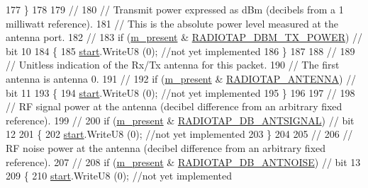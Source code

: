 \begin{DoxyCode}
177     \}
178 
179   \textcolor{comment}{//}
180   \textcolor{comment}{// Transmit power expressed as dBm (decibels from a 1 milliwatt reference).}
181   \textcolor{comment}{// This is the absolute power level measured at the antenna port.}
182   \textcolor{comment}{//}
183   \textcolor{keywordflow}{if} (\hyperlink{classns3_1_1RadiotapHeader_a8b8aca212245ad4ad1aa796d4cc802bb}{m\_present} & \hyperlink{classns3_1_1RadiotapHeader_afd15dfe66387dfbcbf62865d024f58ffa5f2ae8d187d9e12a5f253dddd4426c38}{RADIOTAP\_DBM\_TX\_POWER}) \textcolor{comment}{// bit 10}
184     \{
185       \hyperlink{namespacevisualizer_1_1core_a2a35e5d8a34af358b508dac8635754e0}{start}.WriteU8 (0); \textcolor{comment}{//not yet implemented}
186     \}
187 
188   \textcolor{comment}{//}
189   \textcolor{comment}{// Unitless indication of the Rx/Tx antenna for this packet.}
190   \textcolor{comment}{// The first antenna is antenna 0.}
191   \textcolor{comment}{//}
192   \textcolor{keywordflow}{if} (\hyperlink{classns3_1_1RadiotapHeader_a8b8aca212245ad4ad1aa796d4cc802bb}{m\_present} & \hyperlink{classns3_1_1RadiotapHeader_afd15dfe66387dfbcbf62865d024f58ffaa440618ab1f857767691342a07af46f9}{RADIOTAP\_ANTENNA}) \textcolor{comment}{// bit 11}
193     \{
194       \hyperlink{namespacevisualizer_1_1core_a2a35e5d8a34af358b508dac8635754e0}{start}.WriteU8 (0); \textcolor{comment}{//not yet implemented}
195     \}
196 
197   \textcolor{comment}{//}
198   \textcolor{comment}{// RF signal power at the antenna (decibel difference from an arbitrary fixed reference).}
199   \textcolor{comment}{//}
200   \textcolor{keywordflow}{if} (\hyperlink{classns3_1_1RadiotapHeader_a8b8aca212245ad4ad1aa796d4cc802bb}{m\_present} & \hyperlink{classns3_1_1RadiotapHeader_afd15dfe66387dfbcbf62865d024f58ffa90aae5cb5f719c05f34dfbedaf390828}{RADIOTAP\_DB\_ANTSIGNAL}) \textcolor{comment}{// bit 12}
201     \{
202       \hyperlink{namespacevisualizer_1_1core_a2a35e5d8a34af358b508dac8635754e0}{start}.WriteU8 (0); \textcolor{comment}{//not yet implemented}
203     \}
204 
205   \textcolor{comment}{//}
206   \textcolor{comment}{// RF noise power at the antenna (decibel difference from an arbitrary fixed reference).}
207   \textcolor{comment}{//}
208   \textcolor{keywordflow}{if} (\hyperlink{classns3_1_1RadiotapHeader_a8b8aca212245ad4ad1aa796d4cc802bb}{m\_present} & \hyperlink{classns3_1_1RadiotapHeader_afd15dfe66387dfbcbf62865d024f58ffa05b0e350da93cd747c540b08f62f240c}{RADIOTAP\_DB\_ANTNOISE}) \textcolor{comment}{// bit 13}
209     \{
210       \hyperlink{namespacevisualizer_1_1core_a2a35e5d8a34af358b508dac8635754e0}{start}.WriteU8 (0); \textcolor{comment}{//not yet implemented}

\end{DoxyCode}
